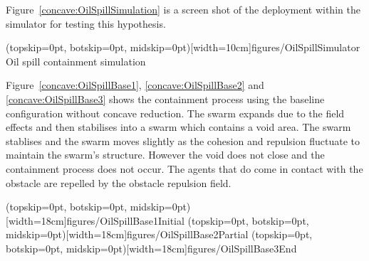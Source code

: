 \documentclass{ieeeaccess}
\begin{document}
Figure~\ref{concave:OilSpillSimulation} is a screen shot of the deployment within the simulator for testing this hypothesis. 


\Figure[t!](topskip=0pt, botskip=0pt, midskip=0pt)[width=10cm]{figures/OilSpillSimulator}
{Oil spill containment simulation\label{concave:OilSpillSimulation}}

Figure~\ref{concave:OilSpillBase1}, \ref{concave:OilSpillBase2} and \ref{concave:OilSpillBase3} shows the containment process using the baseline configuration without concave reduction. The swarm expands due to the field effects and then stabilises into a swarm which contains a void area. The swarm stablises and the swarm moves slightly as the cohesion and repulsion fluctuate to maintain the swarm's structure. However the void does not close and the containment process does not occur. The agents that do come in contact with the obstacle are repelled by the obstacle repulsion field.

\Figure[t!](topskip=0pt, botskip=0pt, midskip=0pt)[width=18cm]{figures/OilSpillBase1}{Initial\label{concave:OilSpillBase1}}
\Figure[t!](topskip=0pt, botskip=0pt, midskip=0pt)[width=18cm]{figures/OilSpillBase2}{Partial\label{concaveOilSpillBase2}}
\Figure[t!](topskip=0pt, botskip=0pt, midskip=0pt)[width=18cm]{figures/OilSpillBase3}{End\label{concave:OilSpillBase3}}
\end{document}
